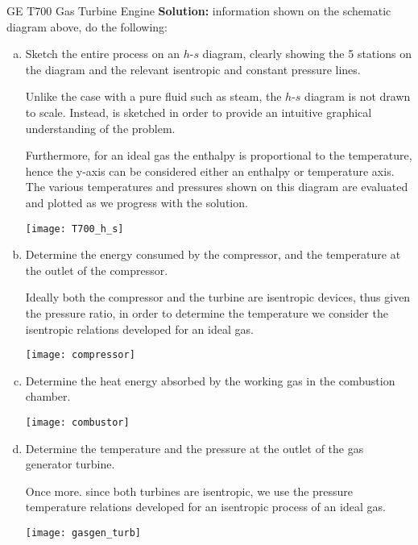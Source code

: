 \begin{example}[label=ex:T700]{GE T700 Gas Turbine Engine}
  {\bf Solution:}
  information shown on the schematic diagram above, do the following:
  \begin{enumerate}[a)]
  \item  Sketch the entire process on an $h$-$s$ diagram, clearly showing the 5 stations on the diagram and the relevant isentropic and constant pressure lines.

    Unlike the case with a pure fluid such as steam, the $h$-$s$ diagram is not drawn to scale. Instead, is sketched in order to provide an intuitive graphical understanding of the problem.

    Furthermore, for an ideal gas the enthalpy is proportional to the temperature, hence the y-axis can be considered either an enthalpy or temperature axis. The various temperatures and pressures shown on this diagram are evaluated and plotted as we progress with the solution.

  \begin{center}
    \texttt{[image: T700\_h\_s]}
  \end{center}
      
   
\item Determine the energy consumed by the compressor, and the temperature at the outlet of the compressor.

  Ideally both the compressor and the turbine are isentropic devices, thus given the pressure ratio, in order to determine the temperature we consider the isentropic relations developed for an ideal gas.

  
  \begin{center}
    \texttt{[image: compressor]}
  \end{center}
  
\item Determine the heat energy absorbed by the working gas in the combustion chamber.
  
  \begin{center}
    \texttt{[image: combustor]}
  \end{center}
  
\item Determine the temperature and the pressure at the outlet of the gas generator turbine.

  Once more. since both turbines are isentropic, we use the pressure temperature relations developed for an isentropic process of an ideal gas.

  \begin{center}
    \texttt{[image: gasgen\_turb]}
  \end{center}
    

\end{enumerate}
\end{example}
